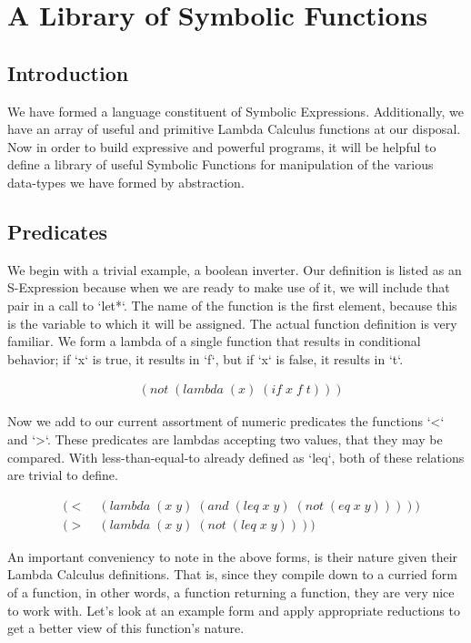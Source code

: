 
\chapter{A Library of Symbolic Functions}
\section{Introduction}
We have formed a language constituent of Symbolic Expressions. Additionally, we 
have an array of useful and primitive Lambda Calculus functions at our disposal. 
Now in order to build expressive and powerful programs, it will be helpful to 
define a library of useful Symbolic Functions for manipulation of the various 
data-types we have formed by abstraction.

\section{Predicates}
We begin with a trivial example, a boolean inverter. Our definition is listed as 
an S-Expression because when we are ready to make use of it, we will include that 
pair in a call to `let*`. The name of the function is the first element, because 
this is the variable to which it will be assigned. The actual function definition 
is very familiar. We form a lambda of a single function that results in 
conditional behavior; if `x` is true, it results in `f`, but if `x` is false, it 
results in `t`.

\begin{align*}
& (not \; (lambda \; (x) \; (if \; x \; f \; t)))
\end{align*}

Now we add to our current assortment of numeric predicates the functions `<` and 
`>`. These predicates are lambdas accepting two values, that they may be compared. 
With less-than-equal-to already defined as `leq`, both of these relations are 
trivial to define.

\begin{align*}
& (< \; &(lambda \; (x \; y) \; (and \; (leq \; x \; y) \; (not \; (eq \; x \; y)))))
\\& (> \; &(lambda \; (x \; y) \; (not \; (leq \; x \; y))))
\end{align*}

An important conveniency to note in the above forms, is their nature given their 
Lambda Calculus definitions. That is, since they compile down to a curried form of 
a function, in other words, a function returning a function, they are very nice to 
work with. Let's look at an example form and apply appropriate reductions to get a 
better view of this function's nature.

